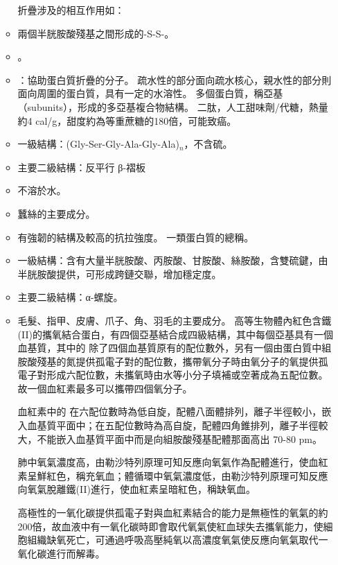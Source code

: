 \documentclass[a4paper,12pt]{report}
\begin{document}
\begin{itemize}
\begin{itemize}
折疊涉及的相互作用如：
\bit
\item 兩個半胱胺酸殘基之間形成的-S-S-。
\item {}。
\item {}：協助蛋白質折疊的分子。
\eit
{}
疏水性的部分面向疏水核心，親水性的部分則面向周圍的蛋白質，具有一定的水溶性。
多個蛋白質，稱亞基（subunits），形成的多亞基複合物結構。
二肽，人工甜味劑/代糖，熱量約4 cal/g，甜度約為等重蔗糖的180倍，可能致癌。
\bit
\item 一級結構：(Gly-Ser-Gly-Ala-Gly-Ala)$_n$，不含硫。
\item 主要二級結構：反平行 β-褶板
\item 不溶於水。
\item 蠶絲的主要成分。
\item 有強韌的結構及較高的抗拉強度。
\eit
{}
一類蛋白質的總稱。
\bit
\item 一級結構：含有大量半胱胺酸、丙胺酸、甘胺酸、絲胺酸，含雙硫鍵，由半胱胺酸提供，可形成跨鏈交聯，增加穩定度。
\item 主要二級結構：α-螺旋。
\item 毛髮、指甲、皮膚、爪子、角、羽毛的主要成分。
\eit
{}
高等生物體內紅色含鐵(II)的攜氧結合蛋白，有四個亞基結合成四級結構，其中每個亞基具有一個血基質，其中的  除了四個血基質原有的配位數外，另有一個由蛋白質中組胺酸殘基的氮提供孤電子對的配位數，攜帶氧分子時由氧分子的氧提供孤電子對形成六配位數，未攜氧時由水等小分子填補或空著成為五配位數。故一個血紅素最多可以攜帶四個氧分子。

血紅素中的  在六配位數時為低自旋，配體八面體排列，離子半徑較小，嵌入血基質平面中；在五配位數時為高自旋，配體四角錐排列，離子半徑較大，不能嵌入血基質平面中而是向組胺酸殘基配體那面高出 70-80 pm。

肺中氧氣濃度高，由勒沙特列原理可知反應向氧氣作為配體進行，使血紅素呈鮮紅色，稱充氧血；體循環中氧氣濃度低，由勒沙特列原理可知反應向氧氣脫離鐵(II)進行，使血紅素呈暗紅色，稱缺氧血。

高極性的一氧化碳提供孤電子對與血紅素結合的能力是無極性的氧氣的約200倍，故血液中有一氧化碳時即會取代氧氣使紅血球失去攜氧能力，使細胞組織缺氧死亡，可通過呼吸高壓純氧以高濃度氧氣使反應向氧氣取代一氧化碳進行而解毒。


\end{itemize}
\end{itemize}
\end{document}
